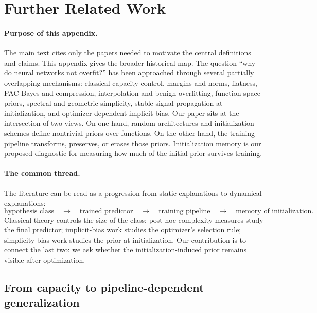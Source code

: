 \documentclass{article}
\begin{document}
\clearpage
\section{Further Related Work}
\label{app:further-related-work}

\paragraph{Purpose of this appendix.}
The main text cites only the papers needed to motivate the central definitions and claims.  This appendix gives the broader historical map.  The question ``why do neural networks not overfit?'' has been approached through several partially overlapping mechanisms: classical capacity control, margins and norms, flatness, PAC-Bayes and compression, interpolation and benign overfitting, function-space priors, spectral and geometric simplicity, stable signal propagation at initialization, and optimizer-dependent implicit bias.  Our paper sits at the intersection of two views.  On one hand, random architectures and initialization schemes define nontrivial priors over functions.  On the other hand, the training pipeline transforms, preserves, or erases those priors.  Initialization memory is our proposed diagnostic for measuring how much of the initial prior survives training.

\paragraph{The common thread.}
The literature can be read as a progression from static explanations to dynamical explanations:
\[
    \text{hypothesis class}
    \quad\to\quad
    \text{trained predictor}
    \quad\to\quad
    \text{training pipeline}
    \quad\to\quad
    \text{memory of initialization}.
\]
Classical theory controls the size of the class; post-hoc complexity measures study the final predictor; implicit-bias work studies the optimizer's selection rule; simplicity-bias work studies the prior at initialization.  Our contribution is to connect the last two: we ask whether the initialization-induced prior remains visible after optimization.

\subsection{From capacity to pipeline-dependent generalization}
\label{app:capacity-pipeline}
\end{document}
